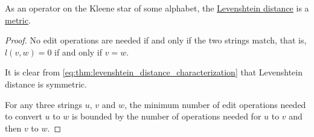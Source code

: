 \begin{proposition}\label{thm:levenshtein_distance_metric}
  As an operator on the Kleene star of some alphabet, the \hyperref[def:levenshtein_distance]{Levenshtein distance} is a \hyperref[def:metric_space]{metric}.
\end{proposition}
\begin{proof}
   No edit operations are needed if and only if the two strings match, that is, \( l(v, w) = 0 \) if and only if \( v = w \).

   It is clear from \eqref{eq:thm:levenshtein_distance_characterization} that Levenshtein distance is symmetric.

   For any three strings \( u \), \( v \) and \( w \), the minimum number of edit operations needed to convert \( u \) to \( w \) is bounded by the number of operations needed for \( u \) to \( v \) and then \( v \) to \( w \).
\end{proof}


